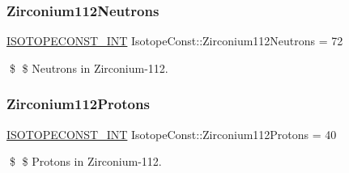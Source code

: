 \subsubsection{\texorpdfstring{Zirconium112\+Neutrons}{Zirconium112Neutrons}}
{\footnotesize\ttfamily \mbox{\hyperlink{group___isotope_const-_macros_ga5f18360b3e99483a35c32d789e62621c}{I\+S\+O\+T\+O\+P\+E\+C\+O\+N\+S\+T\+\_\+\+I\+NT}} Isotope\+Const\+::\+Zirconium112\+Neutrons = 72}

\$ \$ Neutrons in Zirconium-\/112. \mbox{\label{group___isotope_const-_zirconium-_zr112_gab20ced5cb81567d34d5b2c0f663ac2e9}} 
\subsubsection{\texorpdfstring{Zirconium112\+Protons}{Zirconium112Protons}}
{\footnotesize\ttfamily \mbox{\hyperlink{group___isotope_const-_macros_ga5f18360b3e99483a35c32d789e62621c}{I\+S\+O\+T\+O\+P\+E\+C\+O\+N\+S\+T\+\_\+\+I\+NT}} Isotope\+Const\+::\+Zirconium112\+Protons = 40}

\$ \$ Protons in Zirconium-\/112. 